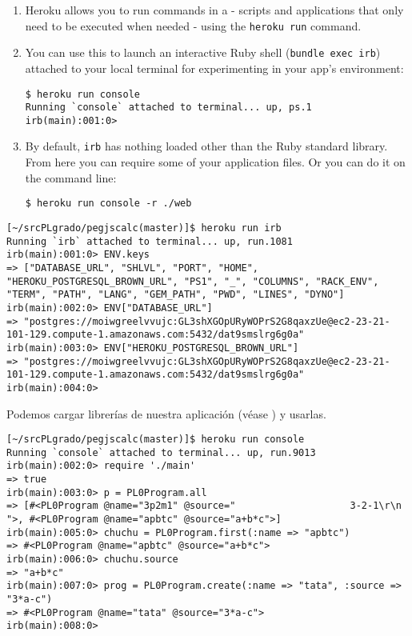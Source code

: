 \begin{enumerate}
\item 
Heroku allows you to run commands in a  - scripts and
applications that only need to be executed when needed - using the
\verb|heroku run| command. 

\item 
You can use this to launch an interactive Ruby
shell (\verb|bundle exec irb|) attached to your local terminal for
experimenting in your app’s environment:
\begin{verbatim}
$ heroku run console
Running `console` attached to terminal... up, ps.1
irb(main):001:0>
\end{verbatim}
\item 
By default, \verb|irb| has nothing loaded other than the Ruby standard
library. From here you can require some of your application files.
Or you can do it on the command line:
\begin{verbatim}
$ heroku run console -r ./web
\end{verbatim}
\end{enumerate}

\begin{verbatim}
[~/srcPLgrado/pegjscalc(master)]$ heroku run irb
Running `irb` attached to terminal... up, run.1081
irb(main):001:0> ENV.keys
=> ["DATABASE_URL", "SHLVL", "PORT", "HOME", "HEROKU_POSTGRESQL_BROWN_URL", "PS1", "_", "COLUMNS", "RACK_ENV", "TERM", "PATH", "LANG", "GEM_PATH", "PWD", "LINES", "DYNO"]
irb(main):002:0> ENV["DATABASE_URL"]
=> "postgres://moiwgreelvvujc:GL3shXGOpURyWOPrS2G8qaxzUe@ec2-23-21-101-129.compute-1.amazonaws.com:5432/dat9smslrg6g0a"
irb(main):003:0> ENV["HEROKU_POSTGRESQL_BROWN_URL"]
=> "postgres://moiwgreelvvujc:GL3shXGOpURyWOPrS2G8qaxzUe@ec2-23-21-101-129.compute-1.amazonaws.com:5432/dat9smslrg6g0a"
irb(main):004:0> 
\end{verbatim}
Podemos cargar librerías de nuestra aplicación
(véase 
) 
y usarlas.
\begin{verbatim}
[~/srcPLgrado/pegjscalc(master)]$ heroku run console
Running `console` attached to terminal... up, run.9013
irb(main):002:0> require './main'
=> true
irb(main):003:0> p = PL0Program.all
=> [#<PL0Program @name="3p2m1" @source="                    3-2-1\r\n          ">, #<PL0Program @name="apbtc" @source="a+b*c">]
irb(main):005:0> chuchu = PL0Program.first(:name => "apbtc")
=> #<PL0Program @name="apbtc" @source="a+b*c">
irb(main):006:0> chuchu.source
=> "a+b*c"
irb(main):007:0> prog = PL0Program.create(:name => "tata", :source => "3*a-c")
=> #<PL0Program @name="tata" @source="3*a-c">
irb(main):008:0> 
\end{verbatim}


